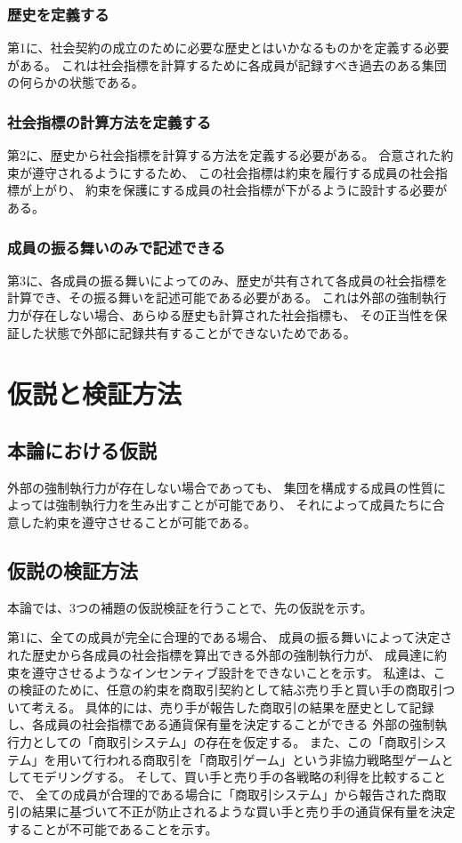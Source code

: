 \documentclass[a4j]{ujreport}
\begin{document}
\subsection{歴史を定義する}
第1に、社会契約の成立のために必要な歴史とはいかなるものかを定義する必要がある。
これは社会指標を計算するために各成員が記録すべき過去のある集団の何らかの状態である。


\subsection{社会指標の計算方法を定義する}
第2に、歴史から社会指標を計算する方法を定義する必要がある。
合意された約束が遵守されるようにするため、
この社会指標は約束を履行する成員の社会指標が上がり、
約束を保護にする成員の社会指標が下がるように設計する必要がある。


\subsection{成員の振る舞いのみで記述できる}
第3に、各成員の振る舞いによってのみ、歴史が共有されて各成員の社会指標を計算でき、その振る舞いを記述可能である必要がある。
これは外部の強制執行力が存在しない場合、あらゆる歴史も計算された社会指標も、
その正当性を保証した状態で外部に記録共有することができないためである。


\chapter{仮説と検証方法}
\section{本論における仮説}
外部の強制執行力が存在しない場合であっても、
集団を構成する成員の性質によっては強制執行力を生み出すことが可能であり、
それによって成員たちに合意した約束を遵守させることが可能である。


\section{仮説の検証方法}
本論では、3つの補題の仮説検証を行うことで、先の仮説を示す。

第1に、全ての成員が完全に合理的である場合、
成員の振る舞いによって決定された歴史から各成員の社会指標を算出できる外部の強制執行力が、
成員達に約束を遵守させるようなインセンティブ設計をできないことを示す。
私達は、この検証のために、任意の約束を商取引契約として結ぶ売り手と買い手の商取引ついて考える。
具体的には、売り手が報告した商取引の結果を歴史として記録し、各成員の社会指標である通貨保有量を決定することができる
外部の強制執行力としての「商取引システム」の存在を仮定する。
また、この「商取引システム」を用いて行われる商取引を「商取引ゲーム」という非協力戦略型ゲームとしてモデリングする。
そして、買い手と売り手の各戦略の利得を比較することで、
全ての成員が合理的である場合に「商取引システム」から報告された商取引の結果に基づいて不正が防止されるような買い手と売り手の通貨保有量を決定することが不可能であることを示す。
\end{document}
